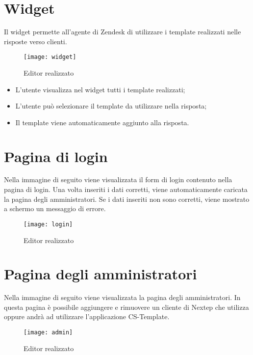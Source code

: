 \section{Widget} 
Il widget permette all'agente di Zendesk di utilizzare i template realizzati nelle risposte verso clienti. 
  \begin{figure}[!h] 
  	\centering 
  	\texttt{[image: widget]} 
  	\caption{Editor realizzato }
  \end{figure}
  \begin{itemize}
  	\item L'utente visualizza nel widget tutti i template realizzati;
  	\item L'utente può selezionare il template da utilizzare nella risposta;
  	\item Il template viene automaticamente aggiunto alla risposta. 
  \end{itemize}
\newpage
\section{Pagina di login}
Nella immagine di seguito viene visualizzata il form di login contenuto nella pagina di login. Una volta inseriti i dati corretti, viene automaticamente caricata la pagina degli amministratori. Se i dati inseriti non sono corretti, viene mostrato a schermo un messaggio di errore.
\begin{figure}[!h] 
	\centering 
	\texttt{[image: login]} 
	\caption{Editor realizzato }
\end{figure}
\section{Pagina degli amministratori}
Nella immagine di seguito viene visualizzata la pagina degli amministratori. In questa pagina è possibile aggiungere e rimuovere un cliente di Nextep che utilizza oppure andrà ad utilizzare l'applicazione CS-Template.
\begin{figure}[!h] 
	\centering 
	\texttt{[image: admin]} 
	\caption{Editor realizzato }
\end{figure}

